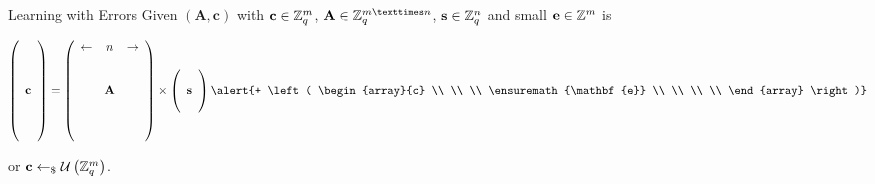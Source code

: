 \documentclass[presentation,smaller]{beamer}
\newcommand{\ZZ}[1][blank]{\ensuremath{\ifthenelse{\equal{#1}{blank}}{\mathbb{Z}}{\mathbb{Z}\left[#1\right]}\xspace}}
\newcommand{\ZZq}[1][blank]{\ensuremath{\ifthenelse{\equal{#1}{blank}}{\mathbb{Z}_q}{\mathbb{Z}_q\left[#1\right]}\xspace}}
\renewcommand{\U}[1]{\ensuremath{\mathcal{U}\left( {#1} \right)}\xspace}
\renewcommand{\vec}[1]{\ensuremath{\mathbf{#1}}\xspace}
\newcommand{\sample}{\ensuremath{\leftarrow_{\$}}}
\begin{document}
\begin{frame}[label={sec:orgheadline7}]{Learning with Errors}
Given \((\vec{A},\vec{c})\) with \(\vec{c} \in \ZZq^{m}\), \(\vec{A} \in \ZZq^{m × n}\), \(\vec{s} \in \ZZq^{n}\) and \alert{small \(\vec{e} \in \ZZ^{m}\)} is

\[
\left(\begin{array}{c}
\\
\\
\\ 
\vec{c} \\
\\
\\
\\
\end{array} \right) = \left(
\begin{array}{ccc}
\leftarrow & n & \rightarrow \\
\\
\\ 
& \vec{A} & \\
\\
\\
\\
\end{array} \right) \times \left( \begin{array}{c}
\\
\vec{s} \\
\\
\end{array} \right) \alert{+ \left(
\begin{array}{c}
\\
\\
\\ 
\vec{e} \\
\\
\\
\\
\end{array} 
\right)}
\]

or \(\vec{c} \sample \U{\ZZq^{m}}\).
\end{frame}
\end{document}
